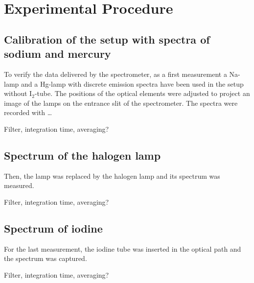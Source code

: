 \section{Experimental Procedure}

\subsection{Calibration of the setup with spectra of sodium and mercury}
To verify the data delivered by the spectrometer, as a first measurement a Na-lamp and a Hg-lamp
with discrete emission spectra have been used in the setup without I$_2$-tube.
The positions of the optical elements were adjusted to project an image of the lamps on the entrance slit
of the spectrometer.
The spectra were recorded with \ldots

Filter, integration time, averaging?

\subsection{Spectrum of the halogen lamp}
Then, the lamp was replaced by the halogen lamp and its spectrum was measured.

Filter, integration time, averaging?

\subsection{Spectrum of iodine}
For the last measurement, the iodine tube was inserted in the optical path and the spectrum was captured.

Filter, integration time, averaging?
